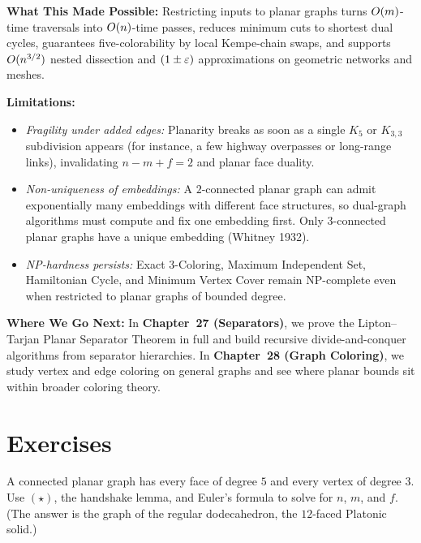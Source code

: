 \begin{connectionbox}
\textbf{What This Made Possible:}
Restricting inputs to planar graphs turns $O(m)$-time traversals into $O(n)$-time passes,
reduces minimum cuts to shortest dual cycles, guarantees five-colorability by local
Kempe-chain swaps, and supports $O(n^{3/2})$ nested dissection and $(1\pm\varepsilon)$
approximations on geometric networks and meshes.

\textbf{Limitations:}
\begin{itemize}
  \item \emph{Fragility under added edges:} Planarity breaks as soon as a single $K_5$ or
        $K_{3,3}$ subdivision appears (for instance, a few highway overpasses or long-range
        links), invalidating $n - m + f = 2$ and planar face duality.
  \item \emph{Non-uniqueness of embeddings:} A $2$-connected planar graph can admit
        exponentially many embeddings with different face structures, so dual-graph
        algorithms must compute and fix one embedding first. Only $3$-connected planar
        graphs have a unique embedding (Whitney 1932).
  \item \emph{NP-hardness persists:} Exact $3$-Coloring, Maximum Independent Set,
        Hamiltonian Cycle, and Minimum Vertex Cover remain NP-complete even when restricted
        to planar graphs of bounded degree.
\end{itemize}

\textbf{Where We Go Next:}
In \textbf{Chapter~27 (Separators)}, we prove the Lipton--Tarjan Planar Separator Theorem
in full and build recursive divide-and-conquer algorithms from separator hierarchies. In
\textbf{Chapter~28 (Graph Coloring)}, we study vertex and edge coloring on general graphs
and see where planar bounds sit within broader coloring theory.
\end{connectionbox}

\section{Exercises}
\label{ch26:exercises}

\begin{exercise}
A connected planar graph has every face of degree $5$ and every vertex of degree $3$. Use
$(\star)$, the handshake lemma, and Euler's formula to solve for $n$, $m$, and $f$. (The
answer is the graph of the regular dodecahedron, the $12$-faced Platonic solid.)
\end{exercise}


